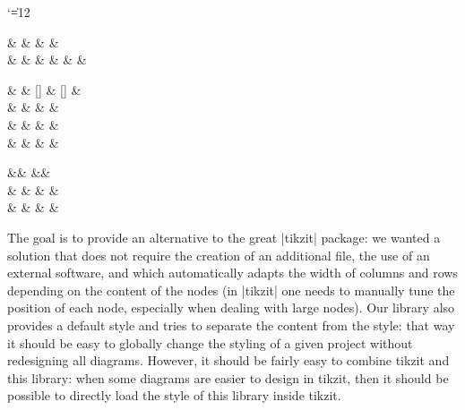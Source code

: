 \documentclass[a4paper,doc2]{ltxdoc} %
\begin{document}
{\catcode`\|=12 %
\begin{codeexample}[width=0pt]
\begin{ZX}
  \zxInput{\ket{\psi}} \rar &  \rar         & \zxCtrl{} \dar \rar & \zxCross{} \dar \rar
                            & \zxBox[add label={Measure}]{\zxMeter{}} \ar[dr,classical,--|] \\
  \ar[r]                    & \zxOCtrl{} \rar \ar[u] & \zxNot{} \rar       & \zxCross{} \ar[rr]
                            &                        &  \rar      & \zxOutput{\ket{\phi}}
\end{ZX}
\end{codeexample}

\begin{codeexample}[width=0pt]
\begin{ZX}[circuit]
  \ar[rr]                           &  & [\zxZeroCol] \zxCtrl{} \dar \ar[rr]    & [\zxZeroCol] &                   \\
  \rar {} &  
                                    &  & \rar {} &  \\
  \rar                              & 
                                    &  & \rar                                   &                                  \\
  \rar {}            & 
                                    &  & \rar {}         & 
\end{ZX}
\end{codeexample}

\begin{codeexample}[width=0cm]
  \begin{ZX}[circuit]
    \ar[rr] && \zxCtrl{} \ar[dl, end subnode=wrapper] \ar[rr] && \\
    \rar    & \zxCtrl{} \dar \rar {} & \zxNot{} \dar \rar                             & \zxCtrl{} \dar \rar & \\
    \rar    & \zxNot{} \rar                                                & \zxCtrl{} \rar                                 & \zxNot{} \rar       & 
  \end{ZX}
\end{codeexample}
}

The goal is to provide an alternative to the great |tikzit| package: we wanted a solution that does not require the creation of an additional file, the use of an external software, and which automatically adapts the width of columns and rows depending on the content of the nodes (in |tikzit| one needs to manually tune the position of each node, especially when dealing with large nodes). Our library also provides a default style and tries to separate the content from the style: that way it should be easy to globally change the styling of a given project without redesigning all diagrams. However, it should be fairly easy to combine tikzit and this library: when some diagrams are easier to design in tikzit, then it should be possible to directly load the style of this library inside tikzit.
\end{document}
